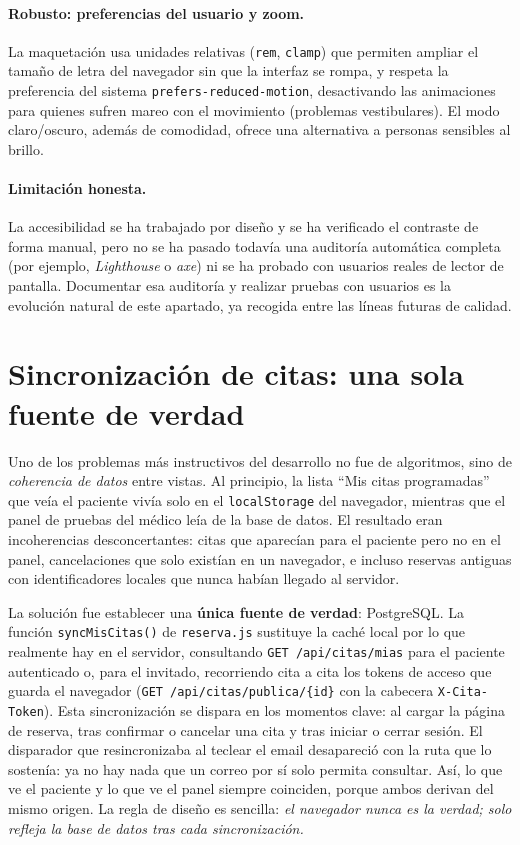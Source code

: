 \documentclass[12pt,a4paper]{report}
\begin{document}
\paragraph{Robusto: preferencias del usuario y zoom.} La maquetación usa unidades relativas (\texttt{rem}, \texttt{clamp}) que permiten ampliar el tamaño de letra del navegador sin que la interfaz se rompa, y respeta la preferencia del sistema \texttt{prefers-reduced-motion}, desactivando las animaciones para quienes sufren mareo con el movimiento (problemas vestibulares). El modo claro/oscuro, además de comodidad, ofrece una alternativa a personas sensibles al brillo.

\paragraph{Limitación honesta.} La accesibilidad se ha trabajado por diseño y se ha verificado el contraste de forma manual, pero no se ha pasado todavía una auditoría automática completa (por ejemplo, \emph{Lighthouse} o \emph{axe}) ni se ha probado con usuarios reales de lector de pantalla. Documentar esa auditoría y realizar pruebas con usuarios es la evolución natural de este apartado, ya recogida entre las líneas futuras de calidad.

\section{Sincronización de citas: una sola fuente de verdad}

Uno de los problemas más instructivos del desarrollo no fue de algoritmos, sino de \emph{coherencia de datos} entre vistas. Al principio, la lista ``Mis citas programadas'' que veía el paciente vivía solo en el \texttt{localStorage} del navegador, mientras que el panel de pruebas del médico leía de la base de datos. El resultado eran incoherencias desconcertantes: citas que aparecían para el paciente pero no en el panel, cancelaciones que solo existían en un navegador, e incluso reservas antiguas con identificadores locales que nunca habían llegado al servidor.

La solución fue establecer una \textbf{única fuente de verdad}: PostgreSQL. La función \texttt{syncMisCitas()} de \texttt{reserva.js} sustituye la caché local por lo que realmente hay en el servidor, consultando \texttt{GET /api/citas/mias} para el paciente autenticado o, para el invitado, recorriendo cita a cita los tokens de acceso que guarda el navegador (\texttt{GET /api/citas/publica/\{id\}} con la cabecera \texttt{X-Cita-Token}). Esta sincronización se dispara en los momentos clave: al cargar la página de reserva, tras confirmar o cancelar una cita y tras iniciar o cerrar sesión. El disparador que resincronizaba al teclear el email desapareció con la ruta que lo sostenía: ya no hay nada que un correo por sí solo permita consultar. Así, lo que ve el paciente y lo que ve el panel siempre coinciden, porque ambos derivan del mismo origen. La regla de diseño es sencilla: \emph{el navegador nunca es la verdad; solo refleja la base de datos tras cada sincronización.}
\end{document}
